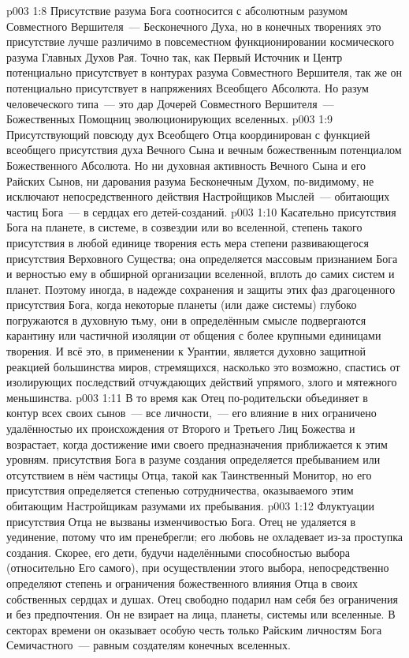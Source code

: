 \vs p003 1:8 Присутствие разума Бога соотносится с абсолютным разумом Совместного Вершителя~--- Бесконечного Духа, но в конечных творениях это присутствие лучше различимо в повсеместном функционировании космического разума Главных Духов Рая. Точно так, как Первый Источник и Центр потенциально присутствует в контурах разума Совместного Вершителя, так же он потенциально присутствует в напряжениях Всеобщего Абсолюта. Но разум человеческого типа~--- это дар Дочерей Совместного Вершителя~--- Божественных Помощниц эволюционирующих вселенных.
\vs p003 1:9 Присутствующий повсюду дух Всеобщего Отца координирован с функцией всеобщего присутствия духа Вечного Сына и вечным божественным потенциалом Божественного Абсолюта. Но ни духовная активность Вечного Сына и его Райских Сынов, ни дарования разума Бесконечным Духом, по\hyp{}видимому, не исключают непосредственного действия Настройщиков Мыслей~--- обитающих частиц Бога~--- в сердцах его детей\hyp{}созданий.
\vs p003 1:10 Касательно присутствия Бога на планете, в системе, в созвездии или во вселенной, степень такого присутствия в любой единице творения есть мера степени развивающегося присутствия Верховного Существа; она определяется массовым признанием Бога и верностью ему в обширной организации вселенной, вплоть до самих систем и планет. Поэтому иногда, в надежде сохранения и защиты этих фаз драгоценного присутствия Бога, когда некоторые планеты (или даже системы) глубоко погружаются в духовную тьму, они в определённым смысле подвергаются карантину или частичной изоляции от общения с более крупными единицами творения. И всё это, в применении к Урантии, является духовно защитной реакцией большинства миров, стремящихся, насколько это возможно, спастись от изолирующих последствий отчуждающих действий упрямого, злого и мятежного меньшинства.
\vs p003 1:11 \pc В то время как Отец по\hyp{}родительски объединяет в контур всех своих сынов~--- все личности,~--- его влияние в них ограничено удалённостью их происхождения от Второго и Третьего Лиц Божества и возрастает, когда достижение ими своего предназначения приближается к этим уровням.  присутствия Бога в разуме создания определяется пребыванием или отсутствием в нём частицы Отца, такой как Таинственный Монитор, но  его присутствия определяется степенью сотрудничества, оказываемого этим обитающим Настройщикам разумами их пребывания.
\vs p003 1:12 Флуктуации присутствия Отца не вызваны изменчивостью Бога. Отец не удаляется в уединение, потому что им пренебрегли; его любовь не охладевает из-за проступка создания. Скорее, его дети, будучи наделёнными способностью выбора (относительно Его самого), при осуществлении этого выбора, непосредственно определяют степень и ограничения божественного влияния Отца в своих собственных сердцах и душах. Отец свободно подарил нам себя без ограничения и без предпочтения. Он не взирает на лица, планеты, системы или вселенные. В секторах времени он оказывает особую честь только Райским личностям Бога Семичастного~--- равным создателям конечных вселенных.
